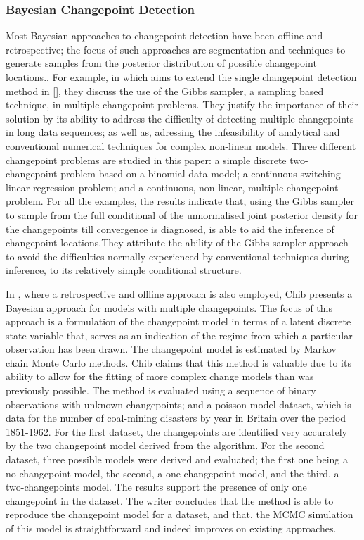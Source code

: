 \documentclass[13pt]{report}
\begin{document}
\subsubsection{Bayesian Changepoint Detection}
Most Bayesian approaches to changepoint detection have been offline and retrospective; the focus of such approaches are segmentation and techniques to generate samples from the posterior distribution of possible changepoint locations.\cite{adams2007bayesian}. For example, in \cite{stephens1994bayesian} which aims to extend the single changepoint detection method in [], they discuss the use of the Gibbs sampler, a sampling based technique, in multiple-changepoint problems.  They justify the importance of their solution by its ability to address the difficulty of detecting multiple changepoints in long data sequences; as well as, adressing the infeasibility of analytical and conventional numerical techniques for complex non-linear models\cite{stephens1994bayesian}. Three different changepoint problems are studied in this paper: a simple discrete two-changepoint problem based on a binomial data model; a continuous switching linear regression problem; and a continuous, non-linear, multiple-changepoint problem. For all the examples, the results indicate that, using the Gibbs sampler to sample from the full conditional of the unnormalised joint posterior density for the changepoints till convergence is diagnosed, is able to aid the inference of changepoint locations\cite{stephens1994bayesian}.They attribute the ability of the Gibbs sampler approach to avoid the difficulties normally experienced by conventional techniques during inference, to its relatively simple conditional structure\cite{stephens1994bayesian}.

In \cite{chib1998estimation}, where a retrospective and offline approach is also employed, Chib presents a Bayesian approach for models with multiple changepoints. The focus of this approach is a formulation of the changepoint model in terms of a latent discrete state variable that, serves as an indication of the regime from which a particular observation has been drawn\cite{chib1998estimation}. The changepoint model is estimated by Markov chain Monte Carlo methods. Chib claims that this method is valuable due to its ability to allow for the fitting of more complex change models than was previously possible. The method is evaluated using a sequence of binary observations with unknown changepoints; and a poisson model dataset, which is data for the number of coal-mining disasters by year in Britain over the period 1851-1962. For the first dataset, the changepoints are identified very accurately by the two changepoint model derived from the algorithm. For the second dataset, three possible models were derived and evaluated; the first one being a no changepoint model, the second, a one-changepoint model, and the third, a two-changepoints model. The results support the presence of only one changepoint in the dataset. The writer concludes that the method is able to reproduce the changepoint model for a dataset, and that, the MCMC simulation of this model is straightforward and indeed improves on existing approaches\cite{chib1998estimation}.
\end{document}
